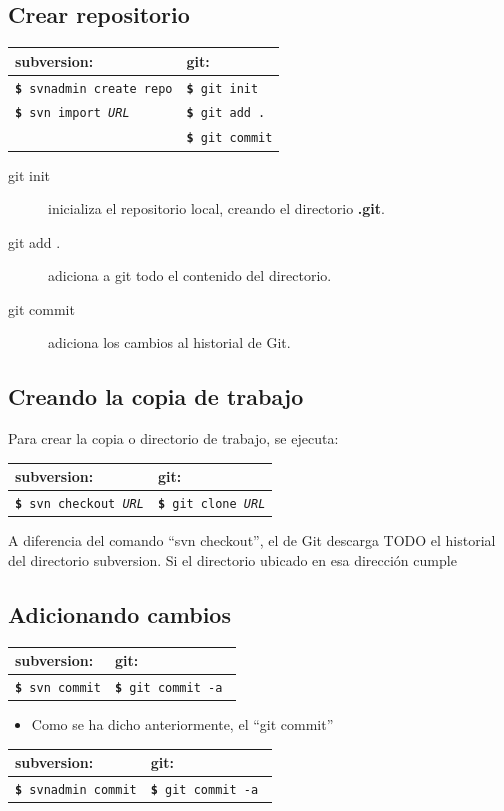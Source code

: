 \documentclass[12pt, spanish, oneside, onecolumn, a4paper]{report}
\newcommand{\svngit}[2]{%
  \begin{tabular}{| l | l |} 
    \hline subversion: & git: \\
    \hline 
    \colorbox{mygray}{\texttt{\textbf{\footnotesize\$} #1}} & \colorbox{mygray}{ \texttt{\textbf{\footnotesize\$} #2}} 
  \end{tabular}
}
\begin{document}
\subsection{Crear repositorio} 
\label{sec:createsvnrepo} 
\begin{tabular}{| l | l |} 
  \hline subversion: & git: \\
\hline 
  \colorbox{mygray}{\texttt{\textbf{\footnotesize\$} svnadmin create repo}} & \colorbox{mygray}{\texttt{\textbf{\footnotesize\$} git init}} \\
\hline 
  \colorbox{mygray}{\texttt{\textbf{\footnotesize\$} svn import \emph{URL}}} & \colorbox{mygray}{\texttt{\textbf{\footnotesize\$} git add .}}  \\
\hline & \colorbox{mygray}{\texttt{\textbf{\footnotesize\$} git commit}}\\
\hline 
\end{tabular}%
\begin{description} 
\item [git init] inicializa el repositorio local, creando el directorio 
  \textbf{ .git}. 
\item [git add .] adiciona a git todo el contenido del directorio. 
\item [git commit] adiciona los cambios al historial de Git. 
\end{description} 
\subsection{Creando la copia de trabajo}\label{sec:svnworkdir} Para crear la copia o directorio de trabajo, se ejecuta: 
\svngit{svn checkout 
  \emph{URL}}{git clone 
  \emph{URL}} A diferencia del comando ``svn checkout'', el de Git descarga TODO el historial del directorio subversion. Si el directorio ubicado en esa dirección cumple 
\subsection{Adicionando cambios} 
\label{sec:commit} 
\begin{tabular}{| l | l |} 
  \hline subversion: & git: \\
\hline 
  \colorbox{mygray}{\texttt{\textbf{\footnotesize\$} svn commit}} & \colorbox{mygray}{\texttt{\textbf{\footnotesize\$} git commit -a }} \\
\hline 
\end{tabular}

\begin{itemize} 
\item Como se ha dicho anteriormente, el ``git commit'' 
\end{itemize} 
\begin{tabular}{| l | l |} 
  \hline subversion: & git: \\
\hline 
  \colorbox{mygray}{\texttt{\textbf{\footnotesize\$} svnadmin commit}} & \colorbox{mygray}{\texttt{\textbf{\footnotesize\$} git commit -a }}  \\
\hline 
\end{tabular}%
\end{document}
